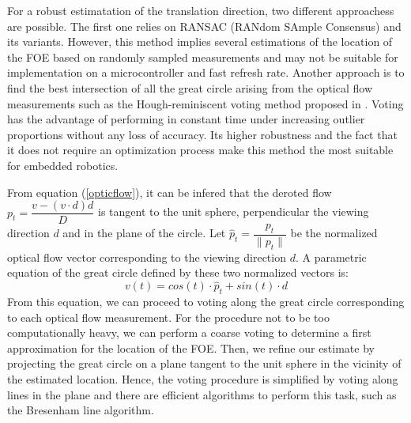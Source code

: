 For a robust estimatation of the translation direction, two different approachess are possible. The first one relies on RANSAC (RANdom SAmple Consensus) and its variants. However, this method implies several estimations of the location of the FOE based on randomly sampled measurements and may not be suitable for implementation on a microcontroller and fast refresh rate. Another approach is to find the best intersection of all the great circle arising from the optical flow measurements such as the Hough-reminiscent voting method proposed in \cite{lim}. Voting has the advantage of performing in constant time under increasing outlier proportions without any loss of accuracy. Its higher robustness and the fact that it does not require an optimization process make this method the most suitable for embedded robotics. 

From equation (\ref{opticflow}), it can be infered that the deroted flow $p_t = \dfrac{v - (v \cdot d)d}{D}$ is tangent to the unit sphere, perpendicular the viewing direction $d$ and in the plane of the circle. Let $\hat{p}_t = \dfrac{p_t}{\|p_t\|}$ be the normalized optical flow vector corresponding to the viewing direction $d$. A parametric equation of the great circle defined by these two normalized vectors is:
\begin{equation}
v(t)= cos(t)\cdot\hat{p}_t + sin(t)\cdot d
\end{equation}
From this equation, we can proceed to voting along the great circle corresponding to each optical flow measurement. For the procedure not to be too computationally heavy, we can perform a coarse voting to determine a first approximation for the location of the FOE. Then, we refine our estimate by projecting the great circle on a plane tangent to the unit sphere in the vicinity of the estimated location. Hence, the voting procedure is simplified by voting along lines in the plane and there are efficient algorithms to perform this task, such as the Bresenham line algorithm.

